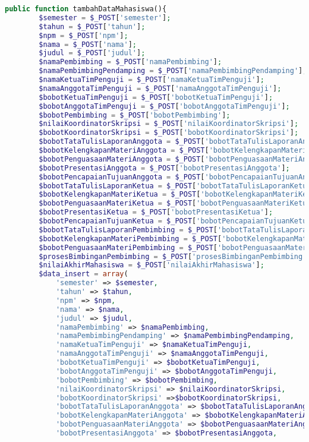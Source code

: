 \begin{lstlisting}[language=PHP,basicstyle=\tiny,caption=C\_skripsi.php]
	public function tambahDataMahasiswa(){
		$semester = $_POST['semester'];
		$tahun = $_POST['tahun'];
		$npm = $_POST['npm'];
		$nama = $_POST['nama'];
		$judul = $_POST['judul'];
		$namaPembimbing = $_POST['namaPembimbing'];
		$namaPembimbingPendamping = $_POST['namaPembimbingPendamping'];
		$namaKetuaTimPenguji = $_POST['namaKetuaTimPenguji'];
		$namaAnggotaTimPenguji = $_POST['namaAnggotaTimPenguji'];
		$bobotKetuaTimPenguji = $_POST['bobotKetuaTimPenguji'];
		$bobotAnggotaTimPenguji = $_POST['bobotAnggotaTimPenguji'];
		$bobotPembimbing = $_POST['bobotPembimbing'];
		$nilaiKoordinatorSkripsi = $_POST['nilaiKoordinatorSkripsi'];
		$bobotKoordinatorSkripsi = $_POST['bobotKoordinatorSkripsi'];
		$bobotTataTulisLaporanAnggota = $_POST['bobotTataTulisLaporanAnggota'];
		$bobotKelengkapanMateriAnggota = $_POST['bobotKelengkapanMateriAnggota'];
		$bobotPenguasaanMateriAnggota = $_POST['bobotPenguasaanMateriAnggota'];
		$bobotPresentasiAnggota = $_POST['bobotPresentasiAnggota'];
		$bobotPencapaianTujuanAnggota = $_POST['bobotPencapaianTujuanAnggota'];
		$bobotTataTulisLaporanKetua = $_POST['bobotTataTulisLaporanKetua'];
		$bobotKelengkapanMateriKetua = $_POST['bobotKelengkapanMateriKetua'];
		$bobotPenguasaanMateriKetua = $_POST['bobotPenguasaanMateriKetua'];
		$bobotPresentasiKetua = $_POST['bobotPresentasiKetua'];
		$bobotPencapaianTujuanKetua = $_POST['bobotPencapaianTujuanKetua'];
		$bobotTataTulisLaporanPembimbing = $_POST['bobotTataTulisLaporanPembimbing'];
		$bobotKelengkapanMateriPembimbing = $_POST['bobotKelengkapanMateriPembimbing'];
		$bobotPenguasaanMateriPembimbing = $_POST['bobotPenguasaanMateriPembimbing'];
		$prosesBimbinganPembimbing = $_POST['prosesBimbinganPembimbing'];
		$nilaiAkhirMahasiswa = $_POST['nilaiAkhirMahasiswa'];
		$data_insert = array(
			'semester' => $semester,
			'tahun' => $tahun,
			'npm' => $npm,
			'nama' => $nama,
			'judul' => $judul,
			'namaPembimbing' => $namaPembimbing,
			'namaPembimbingPendamping' => $namaPembimbingPendamping,
			'namaKetuaTimPenguji' => $namaKetuaTimPenguji,
			'namaAnggotaTimPenguji' => $namaAnggotaTimPenguji,
			'bobotKetuaTimPenguji' => $bobotKetuaTimPenguji,
			'bobotAnggotaTimPenguji' => $bobotAnggotaTimPenguji,
			'bobotPembimbing' => $bobotPembimbing,
			'nilaiKoordinatorSkripsi' => $nilaiKoordinatorSkripsi,
			'bobotKoordinatorSkripsi' =>$bobotKoordinatorSkripsi,
			'bobotTataTulisLaporanAnggota' => $bobotTataTulisLaporanAnggota,
			'bobotKelengkapanMateriAnggota' => $bobotKelengkapanMateriAnggota,
			'bobotPenguasaanMateriAnggota' => $bobotPenguasaanMateriAnggota,
			'bobotPresentasiAnggota' => $bobotPresentasiAnggota,

\end{lstlisting}
